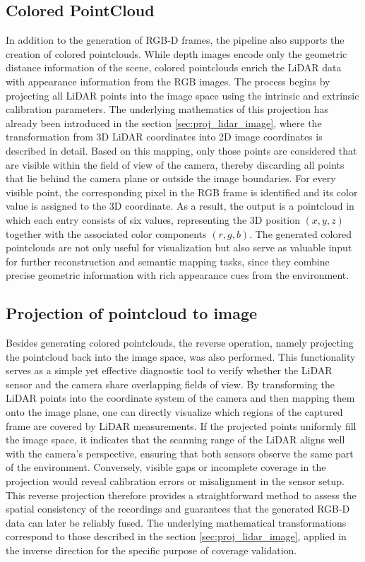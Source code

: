 \documentclass[english, bachelor, utf8]{base/thesis_telematics}
\begin{document}
\subsection*{Colored PointCloud}
In addition to the generation of RGB-D frames, the pipeline also supports the creation of colored 
pointclouds. While depth images encode only the geometric distance information of the scene, 
colored pointclouds enrich the LiDAR data with appearance information from the RGB images. The 
process begins by projecting all LiDAR points into the image space using the intrinsic and extrinsic 
calibration parameters. The underlying mathematics of this projection has already been introduced in 
the section \ref{sec:proj_lidar_image}, where the transformation from 3D LiDAR 
coordinates into 2D image coordinates is described in detail. Based on this mapping, only those 
points are considered that are visible within the field of view of the camera, thereby discarding 
all points that lie behind the camera plane or outside the image boundaries. For every visible 
point, the corresponding pixel in the RGB frame is identified and its color value is assigned to 
the 3D coordinate. As a result, the output is a pointcloud in which each entry consists of six 
values, representing the 3D position $(x, y, z)$ together with the associated color components 
$(r, g, b)$. The generated colored pointclouds are not only useful for visualization but also serve 
as valuable input for further reconstruction and semantic mapping tasks, since they combine precise 
geometric information with rich appearance cues from the environment.

\subsection*{Projection of pointcloud to image}
Besides generating colored pointclouds, the reverse operation, namely projecting the pointcloud 
back into the image space, was also performed. This functionality serves as a simple yet effective 
diagnostic tool to verify whether the LiDAR sensor and the camera share overlapping fields of view. 
By transforming the LiDAR points into the coordinate system of the camera and then mapping them 
onto the image plane, one can directly visualize which regions of the captured frame are covered by 
LiDAR measurements. If the projected points uniformly fill the image space, it indicates that the 
scanning range of the LiDAR aligns well with the camera's perspective, ensuring that both sensors 
observe the same part of the environment. Conversely, visible gaps or incomplete coverage in the 
projection would reveal calibration errors or misalignment in the sensor setup. This reverse 
projection therefore provides a straightforward method to assess the spatial consistency of the 
recordings and guarantees that the generated RGB-D data can later be reliably fused. The underlying 
mathematical transformations correspond to those described in the section \ref{sec:proj_lidar_image},
applied in the inverse direction for the specific purpose of coverage validation.
\end{document}
